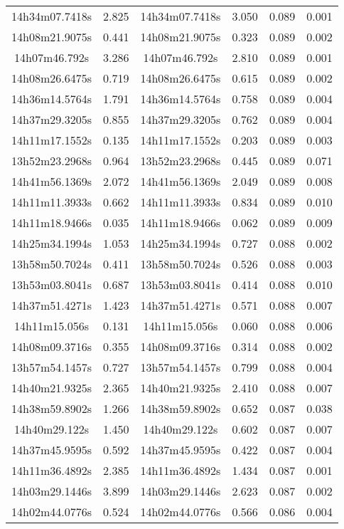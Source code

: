 \begin{table}
\begin{tabular}{cccccc}
14h34m07.7418s & 2.825 & 14h34m07.7418s & 3.050 & 0.089 & 0.001 \\
14h08m21.9075s & 0.441 & 14h08m21.9075s & 0.323 & 0.089 & 0.002 \\
14h07m46.792s & 3.286 & 14h07m46.792s & 2.810 & 0.089 & 0.001 \\
14h08m26.6475s & 0.719 & 14h08m26.6475s & 0.615 & 0.089 & 0.002 \\
14h36m14.5764s & 1.791 & 14h36m14.5764s & 0.758 & 0.089 & 0.004 \\
14h37m29.3205s & 0.855 & 14h37m29.3205s & 0.762 & 0.089 & 0.004 \\
14h11m17.1552s & 0.135 & 14h11m17.1552s & 0.203 & 0.089 & 0.003 \\
13h52m23.2968s & 0.964 & 13h52m23.2968s & 0.445 & 0.089 & 0.071 \\
14h41m56.1369s & 2.072 & 14h41m56.1369s & 2.049 & 0.089 & 0.008 \\
14h11m11.3933s & 0.662 & 14h11m11.3933s & 0.834 & 0.089 & 0.010 \\
14h11m18.9466s & 0.035 & 14h11m18.9466s & 0.062 & 0.089 & 0.009 \\
14h25m34.1994s & 1.053 & 14h25m34.1994s & 0.727 & 0.088 & 0.002 \\
13h58m50.7024s & 0.411 & 13h58m50.7024s & 0.526 & 0.088 & 0.003 \\
13h53m03.8041s & 0.687 & 13h53m03.8041s & 0.414 & 0.088 & 0.010 \\
14h37m51.4271s & 1.423 & 14h37m51.4271s & 0.571 & 0.088 & 0.007 \\
14h11m15.056s & 0.131 & 14h11m15.056s & 0.060 & 0.088 & 0.006 \\
14h08m09.3716s & 0.355 & 14h08m09.3716s & 0.314 & 0.088 & 0.002 \\
13h57m54.1457s & 0.727 & 13h57m54.1457s & 0.799 & 0.088 & 0.004 \\
14h40m21.9325s & 2.365 & 14h40m21.9325s & 2.410 & 0.088 & 0.007 \\
14h38m59.8902s & 1.266 & 14h38m59.8902s & 0.652 & 0.087 & 0.038 \\
14h40m29.122s & 1.450 & 14h40m29.122s & 0.602 & 0.087 & 0.007 \\
14h37m45.9595s & 0.592 & 14h37m45.9595s & 0.422 & 0.087 & 0.004 \\
14h11m36.4892s & 2.385 & 14h11m36.4892s & 1.434 & 0.087 & 0.001 \\
14h03m29.1446s & 3.899 & 14h03m29.1446s & 2.623 & 0.087 & 0.002 \\
14h02m44.0776s & 0.524 & 14h02m44.0776s & 0.566 & 0.086 & 0.004 \\

\end{tabular}
\end{table}
